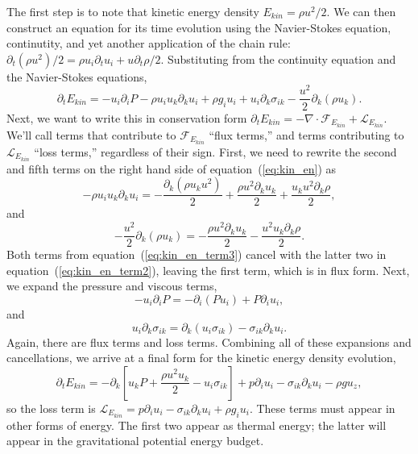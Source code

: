 \documentclass[letterpaper,12pt]{paper}
\begin{document}
The first step is to note that kinetic energy density
$E_{kin} = \rho u^2/2$. We can then construct an equation for its time
evolution using the Navier-Stokes equation, continutity, and yet
another application of the chain rule:
$\partial_t (\rho u^2)/2 = \rho u_i \partial_t u_i + u \partial_t
\rho/2$. Substituting from the continuity equation and the Navier-Stokes equations, 
\begin{equation}
  \label{eq:kin_en}
  \partial_t E_{kin} = -u_i \partial_i P - \rho u_i u_k \partial_k u_i + \rho g_i u_i + u_i \partial_k \sigma_{ik} - \frac{u^2}{2} \partial_k ( \rho u_k).
\end{equation}
Next, we want to write this in conservation form
$\partial_t E_{kin} = - \nabla \cdot \mathcal{F}_{E_{kin}} +
\mathcal{L}_{E_{kin}}$.
We'll call terms that contribute to $\mathcal{F}_{E_{kin}}$ ``flux
terms,'' and terms contributing to $\mathcal{L}_{E_{kin}}$ ``loss
terms,'' regardless of their sign. First, we need to rewrite the
second and fifth terms on the right hand side of
equation~(\ref{eq:kin_en}) as
\begin{equation}
  \label{eq:kin_en_term2}
  - \rho u_i u_k \partial_k u_i = -\frac{\partial_k (\rho u_k u^2)}{2} + \frac{\rho u^2 \partial_k u_k}{2} + \frac{u_k u^2 \partial_k \rho}{2}, 
\end{equation}
and
\begin{equation}
  \label{eq:kin_en_term3}
  -\frac{u^2}{2} \partial_k(\rho u_k) = -\frac{\rho u^2 \partial_k u_k }{2} -\frac{u^2 u_k \partial_k \rho}{2}.
\end{equation}
Both terms from equation~(\ref{eq:kin_en_term3}) cancel with the
latter two in equation~(\ref{eq:kin_en_term2}), leaving the first term, which is in flux form. Next, we expand the pressure and viscous terms,
\begin{equation}
  \label{eq:kin_en_pressure}
  -u_i \partial_i P  = - \partial_i (P u_i)+ P \partial_i u_i,
\end{equation}
and
\begin{equation}
  \label{eq:kin_en_viscous}
u_i \partial_k \sigma_{ik} = \partial_k (u_i \sigma_{ik}) - \sigma_{ik} \partial_k u_i.
\end{equation}
Again, there are flux terms and loss terms. Combining all of these expansions and cancellations, we arrive at a final form for the kinetic energy density evolution,
\begin{equation}
  \label{eq:final_kin_en}
  \partial_t E_{kin} = - \partial_k \left[ u_k P + \frac{\rho u^2 u_k}{2} - u_i \sigma_{ik} \right] + p \partial_i u_i - \sigma_{ik} \partial_k u_i - \rho g u_z,
\end{equation}
so the loss term is
$\mathcal{L}_{E_{kin}} = p \partial_i u_i - \sigma_{ik} \partial_k u_i
+ \rho g_i u_i$.
These terms must appear in other forms of energy. The first two appear
as thermal energy; the latter will appear in the gravitational potential energy budget.
\end{document}
